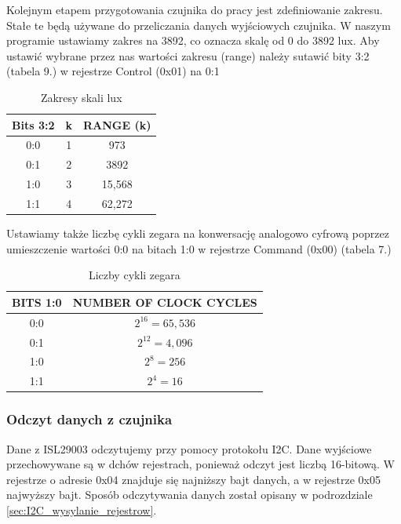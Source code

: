     Kolejnym etapem przygotowania czujnika do pracy jest zdefiniowanie zakresu. Stałe te będą używane do przeliczania danych wyjściowych czujnika. W naszym programie ustawiamy zakres na 3892, co oznacza skalę od 0 do 3892 lux. Aby ustawić wybrane przez nas wartości zakresu (range) należy sutawić bity 3:2 (tabela 9.) w rejestrze Control (0x01) na 0:1
    \begin{table}[H]
        \centering
        \begin{tabular}{|c|c|c|}
        \hline
        Bits 3:2 & k & RANGE (k)\\
        \hline
        0:0 & 1 & 973\\
        0:1 & 2 & 3892\\
        1:0 & 3 & 15,568\\
        1:1 & 4 & 62,272\\
        \hline
        \end{tabular}
        \caption{Zakresy skali lux}
    \end{table}
    Ustawiamy także liczbę cykli zegara na konwersację analogowo cyfrową poprzez umieszczenie wartości 0:0 na bitach 1:0 w rejestrze Command (0x00) (tabela 7.)
    \begin{table}[H]
        \centering
        \begin{tabular}{|c|c|}
        \hline
        BITS 1:0 & NUMBER OF CLOCK CYCLES\\
        \hline
        0:0 & $2^{16} = 65,536$\\
        0:1 & $2^{12} = 4,096$\\
        1:0 & $2^{8} = 256$\\
        1:1 & $2^{4} = 16$\\
        \hline
        \end{tabular}
        \caption{Liczby cykli zegara}
    \end{table}

    \subsubsection{Odczyt danych z czujnika}
    Dane z ISL29003 odczytujemy przy pomocy protokołu I2C. Dane wyjściowe przechowywane są w dchów rejestrach, ponieważ odczyt jest liczbą 16-bitową. W rejestrze o adresie 0x04 znajduje się najniższy bajt danych, a w rejestrze 0x05 najwyższy bajt. Sposób odczytywania danych został opisany w podrozdziale \ref{sec:I2C_wysylanie_rejestrow}.

